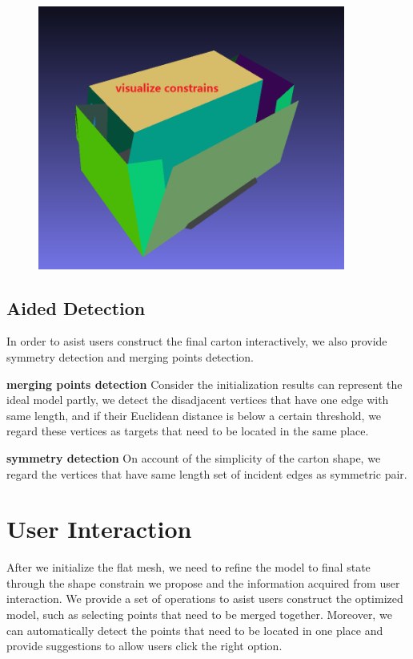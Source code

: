 \documentclass[submission]{gmp2018}
\begin{document}
{}

\begin{figure}
	\centering
	\includegraphics[width=0.9\textwidth]{images/constrains.png}
	\caption{}
	\label{fig:constrain}
\end{figure}


\subsection{Aided Detection}
In order to asist users construct the final carton interactively, we also provide symmetry detection and merging points detection.

\noindent
\textbf{merging points detection} Consider the initialization results can represent the ideal model partly, we detect the disadjacent vertices that have one edge with same length, and if their Euclidean distance is below a certain threshold, we regard these vertices as targets that need to be located in the same place.

\noindent
\textbf{symmetry detection} On account of the simplicity of the carton shape, we regard the vertices that have same length set of incident edges as symmetric pair.


\section{User Interaction}\label{sec:interaction}
After we initialize the flat mesh, we need to refine the model to final state through the shape constrain we propose and the information acquired from user interaction. We provide a set of operations to asist users construct the optimized model, such as selecting points that need to be merged together. Moreover, we can automatically detect the points that need to be located in one place and provide suggestions to allow users click the right option.
\end{document}
